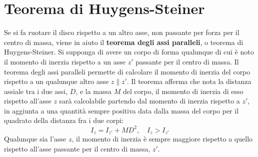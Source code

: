 \documentclass[10pt,a4paper]{book}
\begin{document}
\section{Teorema di Huygens-Steiner}

Se si fa ruotare il disco rispetto a un altro asse, non passante per forza per il centro di massa,  viene in aiuto il \textbf{teorema degli assi paralleli}, o teorema di Huygens-Steiner. Si supponga di avere un corpo di forma qualunque di cui è noto il momento di inerzia rispetto a un asse $z'$ passante per il centro di massa. Il teorema degli assi paralleli permette di calcolare il momento di inerzia del corpo rispetto a un qualunque altro asse $z \parallel z'$. Il teorema afferma che nota la distanza assiale tra i due assi, $D$, e la massa $M$ del corpo, il momento di inerzia di esso rispetto all'asse $z$ sarà calcolabile partendo dal momento di inerzia rispetto a $z'$, in aggiunta a una quantità sempre positiva data dalla massa del corpo per il quadrato della distanza fra i due corpi:
\[
	\boxed{I_z = I_{z'} + MD^2, \quad I_z > I_{z'}}
\]
Qualunque sia l'asse $z$, il momento di inerzia è sempre maggiore rispetto a quello rispetto all'asse passante per il centro di massa, $z'$.
\end{document}
